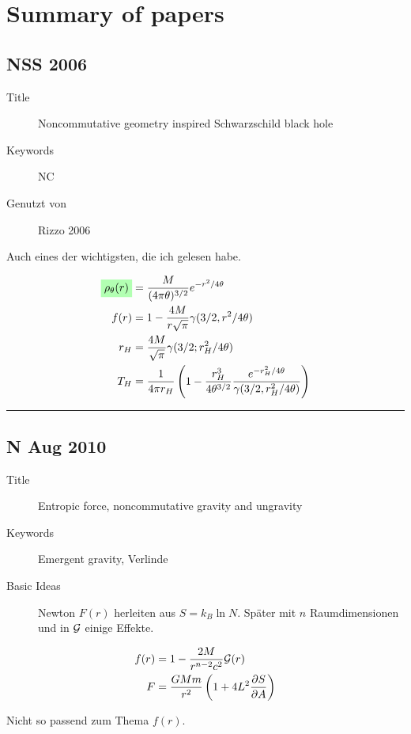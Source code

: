 \documentclass[10pt,a4paper, fleqn]{article}
\newcommand{\highlight}[1]{%
  \colorbox{green!30}{$\displaystyle#1$}}
\begin{document}
\section{Summary of papers}
\begin{multicols}{2}
\subsection{NSS 2006} \label{NSS 2006}
\begin{description}
  \item[Title] Noncommutative geometry inspired Schwarzschild black hole
  \item[Keywords] NC
  \item[Genutzt von] Rizzo 2006
\end{description}

Auch eines der wichtigsten, die ich gelesen habe.


\vfill
\columnbreak
\begin{align}
\highlight{ \rho_\theta(r)}  &= \frac{M}{(4 \pi \theta)^{3/2}} e^{-r^2 / 4 \theta} \\
f(r) &= 1 - \frac{4 M }{r \sqrt{\pi}} \gamma(3/2, r^2/4\theta) \\
r_H & = \frac{4M}{\sqrt{\pi}} \gamma(3/2; r_H^2 / 4\theta) \\
T_H &= \frac{1}{4 \pi r_H} \left( 1 - \frac{r^3_H}{4 \theta^{3/2}} \frac{e^{-r^2_H / 4 \theta}}{\gamma(3/2, r_H^2 / 4 \theta)} \right)  %
\end{align}
\vfill

\end{multicols}
\rule{0.9\textwidth}{0.4pt}
\begin{multicols}{2}
\subsection{N Aug 2010}
\begin{description}
  \item[Title] Entropic force, noncommutative gravity and ungravity
  \item[Keywords] Emergent gravity, Verlinde
  \item[Basic Ideas] Newton $F(r)$ herleiten aus $S=k_B \ln N$. Später mit $n$ Raumdimensionen und in $\cal G$ einige Effekte.
\end{description}


\vfill
\columnbreak
\begin{align}
f(r) &= 1 - \frac{2M}{r^{n-2} c^2} {\cal G}(r) \\
F &= \frac{G M m}{r^2} \left( 1 + 4 L^2 \frac{\partial S}{\partial A} \right)
\end{align}

Nicht so passend zum Thema $f(r)$.

\end{multicols}
\end{document}
